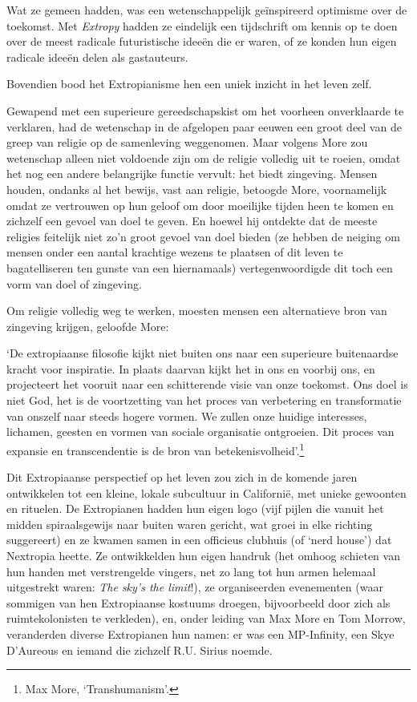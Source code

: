 \documentclass[smalldemyvopaper,11pt,twoside,onecolumn,openright,extrafontsizes,hidelinks]{memoir}
\begin{document}
Wat ze gemeen hadden, was een wetenschappelijk geïnspireerd optimisme
over de toekomst. Met \emph{Extropy} hadden ze eindelijk een tijdschrift
om kennis op te doen over de meest radicale futuristische ideeën die er
waren, of ze konden hun eigen radicale ideeën delen als gastauteurs.

Bovendien bood het Extropianisme hen een uniek inzicht in het leven
zelf.

Gewapend met een superieure gereedschapskist om het voorheen
onverklaarde te verklaren, had de wetenschap in de afgelopen paar eeuwen
een groot deel van de greep van religie op de samenleving weggenomen.
Maar volgens More zou wetenschap alleen niet voldoende zijn om de
religie volledig uit te roeien, omdat het nog een andere belangrijke
functie vervult: het biedt zingeving. Mensen houden, ondanks al het
bewijs, vast aan religie, betoogde More, voornamelijk omdat ze
vertrouwen op hun geloof om door moeilijke tijden heen te komen en
zichzelf een gevoel van doel te geven. En hoewel hij ontdekte dat de
meeste religies feitelijk niet zo'n groot gevoel van doel bieden (ze
hebben de neiging om mensen onder een aantal krachtige wezens te
plaatsen of dit leven te bagatelliseren ten gunste van een hiernamaals)
vertegenwoordigde dit toch een vorm van doel of zingeving.

Om religie volledig weg te werken, moesten mensen een alternatieve bron
van zingeving krijgen, geloofde More:

`De extropiaanse filosofie kijkt niet buiten ons naar een superieure
buitenaardse kracht voor inspiratie. In plaats daarvan kijkt het in ons
en voorbij ons, en projecteert het vooruit naar een schitterende visie
van onze toekomst. Ons doel is niet God, het is de voortzetting van het
proces van verbetering en transformatie van onszelf naar steeds hogere
vormen. We zullen onze huidige interesses, lichamen, geesten en vormen
van sociale organisatie ontgroeien. Dit proces van expansie en
transcendentie is de bron van betekenisvolheid'.\footnote{Max More,
  `Transhumanism'.}

Dit Extropiaanse perspectief op het leven zou zich in de komende jaren
ontwikkelen tot een kleine, lokale subcultuur in Californië, met unieke
gewoonten en rituelen. De Extropianen hadden hun eigen logo (vijf pijlen
die vanuit het midden spiraalsgewijs naar buiten waren gericht, wat
groei in elke richting suggereert) en ze kwamen samen in een officieus
clubhuis (of `nerd house') dat Nextropia heette. Ze ontwikkelden hun
eigen handruk (het omhoog schieten van hun handen met verstrengelde
vingers, net zo lang tot hun armen helemaal uitgestrekt waren: \emph{The
sky's the limit}!), ze organiseerden evenementen (waar sommigen van hen
Extropiaanse kostuums droegen, bijvoorbeeld door zich als
ruimtekolonisten te verkleden), en, onder leiding van Max More en Tom
Morrow, veranderden diverse Extropianen hun namen: er was een
MP-Infinity, een Skye D'Aureous en iemand die zichzelf R.U. Sirius
noemde.
\end{document}
